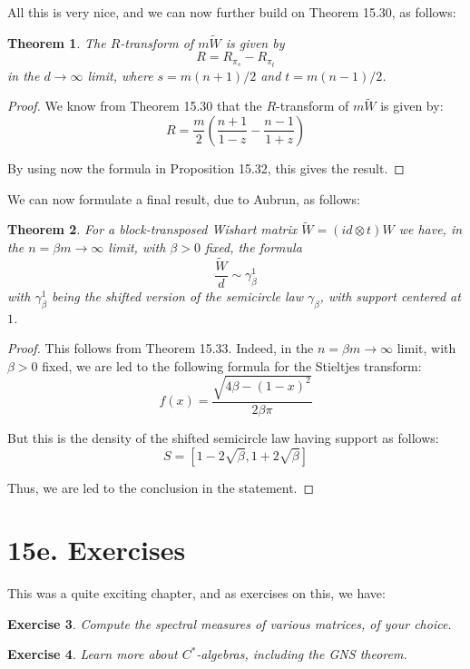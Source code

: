 \documentclass[12pt]{amsbook}
\newtheorem{theorem}{Theorem}[chapter]
\newtheorem{exercise}[theorem]{Exercise}
\begin{document}
All this is very nice, and we can now further build on Theorem 15.30, as follows:

\begin{theorem}
The $R$-transform of $m\tilde{W}$ is given by
$$R=R_{\pi_s}-R_{\pi_t}$$
in the $d\to\infty$ limit, where $s=m(n+1)/2$ and $t=m(n-1)/2$.
\end{theorem}

\begin{proof}
We know from Theorem 15.30 that the $R$-transform of $m\tilde{W}$ is given by:
$$R=\frac{m}{2}\left(\frac{n+1}{1-z}-\frac{n-1}{1+z}\right)$$

By using now the formula in Proposition 15.32, this gives the result.
\end{proof}

We can now formulate a final result, due to Aubrun, as follows:

\begin{theorem}
For a block-transposed Wishart matrix $\tilde{W}=(id\otimes t)W$ we have, in the $n=\beta m\to\infty$ limit, with $\beta>0$ fixed, the formula
$$\frac{\tilde{W}}{d}\sim\gamma_{\beta}^1$$
with $\gamma_\beta^1$ being the shifted version of the semicircle law $\gamma_\beta$, with support centered at $1$.
\end{theorem}

\begin{proof}
This follows from Theorem 15.33. Indeed, in the $n=\beta m\to\infty$ limit, with $\beta>0$ fixed, we are led to the following formula for the Stieltjes transform:
$$f(x)=\frac{\sqrt{4\beta-(1-x)^2}}{2\beta\pi}$$

But this is the density of the shifted semicircle law having support as follows:
$$S=[1-2\sqrt{\beta},1+2\sqrt{\beta}]$$

Thus, we are led to the conclusion in the statement.
\end{proof}

\section*{15e. Exercises}

This was a quite exciting chapter, and as exercises on this, we have:

\begin{exercise}
Compute the spectral measures of various matrices, of your choice.
\end{exercise}

\begin{exercise}
Learn more about $C^*$-algebras, including the GNS theorem.
\end{exercise}
\end{document}

